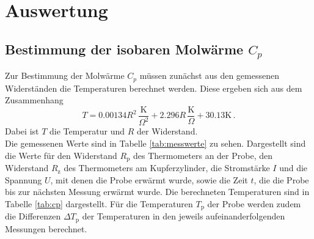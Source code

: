 \section{Auswertung}
\label{sec:Auswertung}

\subsection{Bestimmung der isobaren Molwärme $C_p$}
\label{subsec:cp}
Zur Bestimmung der Molwärme $C_p$ müssen zunächst aus den gemessenen
Widerständen die Temperaturen berechnet werden. Diese ergeben sich aus dem
Zusammenhang
\begin{equation*}
  T=0.00134R^2\,\frac{\text{K}}{\Omega^2}+2.296R\,\frac{\text{K}}{\Omega}+30.13\text{K} \,.
\end{equation*}
Dabei ist $T$ die Temperatur und $R$ der Widerstand.\\
Die gemessenen Werte sind in Tabelle \ref{tab:messwerte} zu sehen.
Dargestellt sind die Werte für den Widerstand $R_\text{p}$ des Thermometers an der Probe,
den Widerstand $R_\text{z}$ des Thermometers am Kupferzylinder, die Stromstärke $I$ und
die Spannung $U$, mit denen die Probe erwärmt wurde, sowie die Zeit $t$,
die die Probe bis zur nächsten Messung erwärmt wurde.
Die berechneten Temperaturen sind in Tabelle \ref{tab:cp} dargestellt. Für die
Temperaturen $T_\text{p}$ der Probe werden zudem die Differenzen $\Delta T_\text{p}$ der Temperaturen
in den jeweils aufeinanderfolgenden Messungen berechnet.


